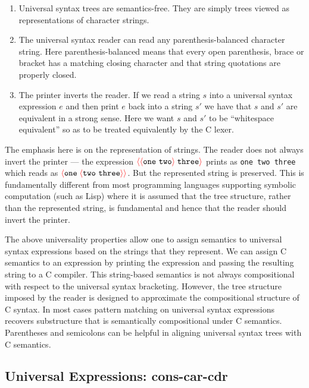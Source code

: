 \documentclass{article}
\newcommand{\fopen}{{\color{red} \langle}}
\newcommand{\fclose}{{\color{red} \rangle}}
\begin{document}
\begin{enumerate}
\item Universal syntax trees are semantics-free.  They are simply trees viewed as representations of character strings.

\item The universal syntax reader can read any parenthesis-balanced character string.
  Here parenthesis-balanced means that every open parenthesis, brace or bracket has a matching closing character and that string quotations
  are properly closed.
  
\item The printer inverts the reader. If we read a string $s$ into a universal syntax expression
  $e$ and then print $e$ back into a string $s'$ we have that $s$ and $s'$ are equivalent in a strong sense.  Here we want
  $s$ and $s'$ to be ``whitespace equivalent'' so as to be treated equivalently by the C lexer.
\end{enumerate}

The emphasis here is on the representation of strings.  The reader does not always invert the printer ---
the expression $\fopen \fopen \mathtt{one~two} \fclose \;\mathtt{three}\fclose$ prints as {\tt one two three} which reads as
$\fopen \mathtt{one}\; \fopen \mathtt{two~three} \fclose \fclose$.  But the represented string is preserved.  This is fundamentally different from
most programming languages supporting symbolic computation (such as Lisp) where it is assumed that the tree structure, rather than the represented string, is fundamental
and hence that the reader should invert the printer.

The above universality properties allow one to assign semantics to universal syntax expressions based on the strings that they represent.  We can assign C
semantics to an expression by printing the expression and passing the resulting string to a C compiler.  This string-based semantics is not always
compositional with respect to the universal syntax bracketing.  However, the tree structure imposed by the reader is designed to approximate the
compositional structure of C syntax.  In most cases pattern matching on universal syntax expressions recovers substructure that is semantically compositional under C
semantics. Parentheses and semicolons can be helpful in aligning universal syntax trees with C semantics.

\subsection{Universal Expressions: cons-car-cdr}
\end{document}
